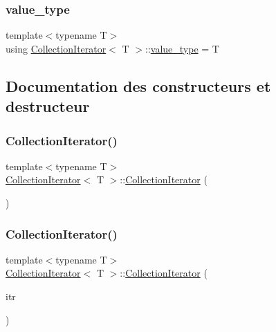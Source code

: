 \subsubsection{\texorpdfstring{value\+\_\+type}{value\_type}}
{\footnotesize\ttfamily template$<$typename T$>$ \\
using \hyperlink{class_collection_iterator}{Collection\+Iterator}$<$ T $>$\+::\hyperlink{class_collection_iterator_a8513f3c29655e48f34f8b6a11b96a71b}{value\+\_\+type} =  T}



\subsection{Documentation des constructeurs et destructeur}
\mbox{\label{class_collection_iterator_ad43d61217203dfc7639ff9cc215cbbb5}} 
\subsubsection{\texorpdfstring{Collection\+Iterator()}{CollectionIterator()}\hspace{0.1cm}{\footnotesize\ttfamily [1/4]}}
{\footnotesize\ttfamily template$<$typename T$>$ \\
\hyperlink{class_collection_iterator}{Collection\+Iterator}$<$ T $>$\+::\hyperlink{class_collection_iterator}{Collection\+Iterator} (\begin{DoxyParamCaption}{ }\end{DoxyParamCaption})\hspace{0.3cm}{\ttfamily [default]}}

\mbox{\label{class_collection_iterator_a9db87c21c0786441895f008bc3508785}} 
\subsubsection{\texorpdfstring{Collection\+Iterator()}{CollectionIterator()}\hspace{0.1cm}{\footnotesize\ttfamily [2/4]}}
{\footnotesize\ttfamily template$<$typename T$>$ \\
\hyperlink{class_collection_iterator}{Collection\+Iterator}$<$ T $>$\+::\hyperlink{class_collection_iterator}{Collection\+Iterator} (\begin{DoxyParamCaption}\item[{const \hyperlink{class_collection_iterator}{Collection\+Iterator}$<$ T $>$ \&}]{itr }\end{DoxyParamCaption})\hspace{0.3cm}{\ttfamily [inline]}}

